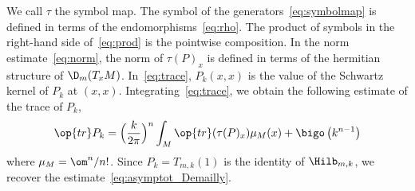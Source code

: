 We call $\tau$ the symbol map. The symbol of the generators~\eqref{eq:symbolmap} is defined in terms of the endomorphisms~\eqref{eq:rho}. The product of symbols in the right-hand side of~\eqref{eq:prod} is the pointwise composition. In the norm estimate~\eqref{eq:norm}, the norm of $\tau (P)_x$ is defined in terms of the hermitian structure of $\D_m (T_xM)$. In~\eqref{eq:trace}, $P_k (x,x)$ is the value of the Schwartz kernel of $P_k$ at $(x,x)$. Integrating~\eqref{eq:trace}, we obtain the following estimate of the trace of $P_k$,
\begin{gather}
\op{tr} P_k = \Bigl(\frac{k}{2\pi} \Bigr)^n \int_M \op{tr} (\tau (P)_x) \mu_M(x) + \bigo \left(k^{n-1}\right)
\end{gather}
where $\mu_M = \om^n /n!$. Since $P_k =T_{m,k} (1)$ is the identity of $\Hilb_{m,k}$, we recover the estimate~\eqref{eq:asymptot_Demailly}.

